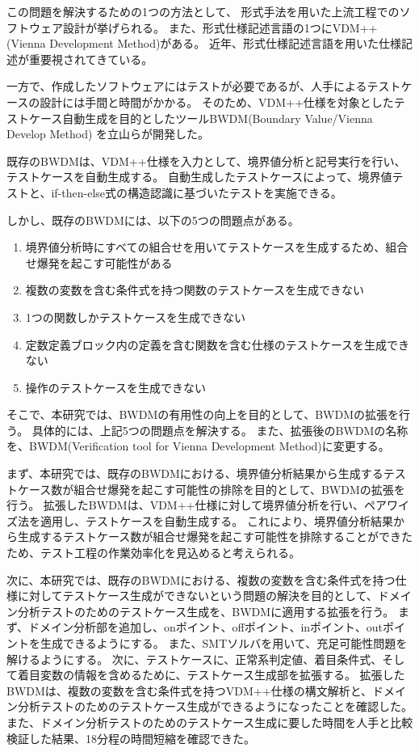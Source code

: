 \documentclass[uplatex, report, a4j, 10pt]{jsbook}
\newcommand{\tool}{BWDM}
\newcommand{\toolFullName}{Verification tool for Vienna Development Method}
\begin{document}
この問題を解決するための1つの方法として、
形式手法を用いた上流工程でのソフトウェア設計が挙げられる。
また、形式仕様記述言語の1つにVDM++(Vienna Development Method)がある。
近年、形式仕様記述言語を用いた仕様記述が重要視されてきている。

一方で、作成したソフトウェアにはテストが必要であるが、人手によるテストケースの設計には手間と時間がかかる。
そのため、VDM++仕様を対象としたテストケース自動生成を目的としたツールBWDM(Boundary Value/Vienna Develop Method)
を立山らが開発した。

既存のBWDMは、VDM++仕様を入力として、境界値分析と記号実行を行い、テストケースを自動生成する。
自動生成したテストケースによって、境界値テストと、if-then-else式の構造認識に基づいたテストを実施できる。

しかし、既存のBWDMには、以下の5つの問題点がある。

\begin{enumerate}[label=(\alph*)]
  \item 境界値分析時にすべての組合せを用いてテストケースを生成するため、組合せ爆発を起こす可能性がある
  \item 複数の変数を含む条件式を持つ関数のテストケースを生成できない
  \item 1つの関数しかテストケースを生成できない
  \item 定数定義ブロック内の定義を含む関数を含む仕様のテストケースを生成できない
  \item 操作のテストケースを生成できない
\end{enumerate}

そこで、本研究では、BWDMの有用性の向上を目的として、BWDMの拡張を行う。
具体的には、上記5つの問題点を解決する。
また、拡張後のBWDMの名称を、\tool{}(\toolFullName{})に変更する。

まず、本研究では、既存のBWDMにおける、境界値分析結果から生成するテストケース数が組合せ爆発を起こす可能性の排除を目的として、BWDMの拡張を行う。
拡張したBWDMは、VDM++仕様に対して境界値分析を行い、ペアワイズ法を適用し、テストケースを自動生成する。
これにより、境界値分析結果から生成するテストケース数が組合せ爆発を起こす可能性を排除することができたため、テスト工程の作業効率化を見込めると考えられる。

次に、本研究では、既存のBWDMにおける、複数の変数を含む条件式を持つ仕様に対してテストケース生成ができないという問題の解決を目的として、ドメイン分析テストのためのテストケース生成を、BWDMに適用する拡張を行う。
まず、ドメイン分析部を追加し、onポイント、offポイント、inポイント、outポイントを生成できるようにする。
また、SMTソルバを用いて、充足可能性問題を解けるようにする。
次に、テストケースに、正常系判定値、着目条件式、そして着目変数の情報を含めるために、テストケース生成部を拡張する。
拡張したBWDMは、複数の変数を含む条件式を持つVDM++仕様の構文解析と、ドメイン分析テストのためのテストケース生成ができるようになったことを確認した。
また、ドメイン分析テストのためのテストケース生成に要した時間を人手と比較検証した結果、18分程の時間短縮を確認できた。
\end{document}
